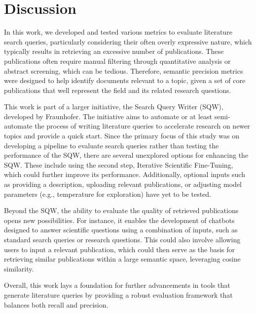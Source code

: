 \section{Discussion}
In this work, we developed and tested various metrics to evaluate literature search queries, particularly considering their often overly expressive nature, which typically results in retrieving an excessive number of publications. These publications often require manual filtering through quantitative analysis or abstract screening, which can be tedious. Therefore, semantic precision metrics were designed to help identify documents relevant to a topic, given a set of core publications that well represent the field and its related research questions.

This work is part of a larger initiative, the Search Query Writer (SQW), developed by Fraunhofer. The initiative aims to automate or at least semi-automate the process of writing literature queries to accelerate research on newer topics and provide a quick start. Since the primary focus of this study was on developing a pipeline to evaluate search queries rather than testing the performance of the SQW, there are several unexplored options for enhancing the SQW. These include using the second step, Iterative Scientific Fine-Tuning, which could further improve its performance. Additionally, optional inputs such as providing a description, uploading relevant publications, or adjusting model parameters (e.g., temperature for exploration) have yet to be tested.

Beyond the SQW, the ability to evaluate the quality of retrieved publications opens new possibilities. For instance, it enables the development of chatbots designed to answer scientific questions using a combination of inputs, such as standard search queries or research questions. This could also involve allowing users to input a relevant publication, which could then serve as the basis for retrieving similar publications within a large semantic space, leveraging cosine similarity.

Overall, this work lays a foundation for further advancements in tools that generate literature queries by providing a robust evaluation framework that balances both recall and precision.


